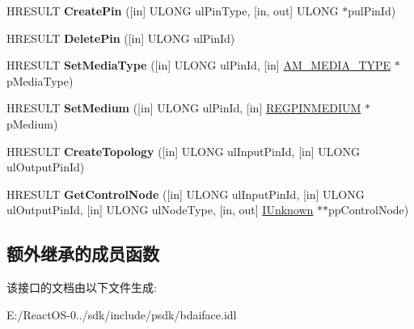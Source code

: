 \begin{DoxyCompactItemize}
\item 
\mbox{\label{interface_i_b_d_a___topology_a209631988d27e886c35e9ea4893da40c}} 
H\+R\+E\+S\+U\+LT {\bfseries Create\+Pin} (\mbox{[}in\mbox{]} U\+L\+O\+NG ul\+Pin\+Type, \mbox{[}in, out\mbox{]} U\+L\+O\+NG $\ast$pul\+Pin\+Id)
\item 
\mbox{\label{interface_i_b_d_a___topology_ae0bea3906744e07cb45efd7d238f5d45}} 
H\+R\+E\+S\+U\+LT {\bfseries Delete\+Pin} (\mbox{[}in\mbox{]} U\+L\+O\+NG ul\+Pin\+Id)
\item 
\mbox{\label{interface_i_b_d_a___topology_ab9d06dad22ace767f1c9977ae776bd38}} 
H\+R\+E\+S\+U\+LT {\bfseries Set\+Media\+Type} (\mbox{[}in\mbox{]} U\+L\+O\+NG ul\+Pin\+Id, \mbox{[}in\mbox{]} \hyperlink{struct_a_m___m_e_d_i_a___t_y_p_e}{A\+M\+\_\+\+M\+E\+D\+I\+A\+\_\+\+T\+Y\+PE} $\ast$p\+Media\+Type)
\item 
\mbox{\label{interface_i_b_d_a___topology_a3b1319cbf8316d5feee7710ccdd87694}} 
H\+R\+E\+S\+U\+LT {\bfseries Set\+Medium} (\mbox{[}in\mbox{]} U\+L\+O\+NG ul\+Pin\+Id, \mbox{[}in\mbox{]} \hyperlink{struct_r_e_g_p_i_n_m_e_d_i_u_m}{R\+E\+G\+P\+I\+N\+M\+E\+D\+I\+UM} $\ast$p\+Medium)
\item 
\mbox{\label{interface_i_b_d_a___topology_aa191470d215fd202fa81d1a227d4630c}} 
H\+R\+E\+S\+U\+LT {\bfseries Create\+Topology} (\mbox{[}in\mbox{]} U\+L\+O\+NG ul\+Input\+Pin\+Id, \mbox{[}in\mbox{]} U\+L\+O\+NG ul\+Output\+Pin\+Id)
\item 
\mbox{\label{interface_i_b_d_a___topology_a996ae5826da365cc67cf046cecf3b41d}} 
H\+R\+E\+S\+U\+LT {\bfseries Get\+Control\+Node} (\mbox{[}in\mbox{]} U\+L\+O\+NG ul\+Input\+Pin\+Id, \mbox{[}in\mbox{]} U\+L\+O\+NG ul\+Output\+Pin\+Id, \mbox{[}in\mbox{]} U\+L\+O\+NG ul\+Node\+Type, \mbox{[}in, out\mbox{]} \hyperlink{interface_i_unknown}{I\+Unknown} $\ast$$\ast$pp\+Control\+Node)
\end{DoxyCompactItemize}
\subsection*{额外继承的成员函数}


该接口的文档由以下文件生成\+:\begin{DoxyCompactItemize}
\item 
E\+:/\+React\+O\+S-\/0../sdk/include/psdk/bdaiface.\+idl\end{DoxyCompactItemize}
